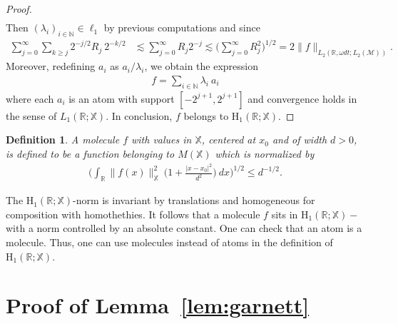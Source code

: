 \documentclass[psamsfonts]{amsart}
\newtheorem{definition}[theorem]{Definition}
\newcommand{\R}{\mathbb{R}}
\newcommand{\N}{\mathbb{N}}
\newcommand{\Lone}{L_1}
\newcommand{\Ltwo}{L_2}
\newcommand{\Hone}{\mathrm{H}_1}
\begin{document}
\begin{proof}
\begin{align*}
        \end{align*}
        Then $(\lambda_i)_{i \in \N} \in \ell_1$ by previous computations and since
        \begin{align*}
          \sum_{j=0}^\infty \sum_{k \geq j} 2^{-j/2} R_j \ 2^{-k/2} &\lesssim \sum_{j=0}^\infty R_j 2^{-j} \lesssim   \Big(\sum_{j=0}^\infty R_j^2\Big)^{1/2} =2                                                                        \|f\|_{\Ltwo(\mathbb{R},\omega dt;\Ltwo(\mathcal{M}))}.
        \end{align*}
        Moreover, redefining $a_i$ as $a_i / \lambda_i$, we obtain the expression
        \begin{align*}
            f = \sum_{i\in\N} \lambda_i \ a_i
        \end{align*}
        where each $a_i$ is an atom with support $[-2^{j+1},2^{j+1}]$ and convergence holds in the sense of $\Lone(\mathbb{R};\mathbb{X})$. In conclusion, $f$ belongs to $\Hone(\R;\mathbb{X})$.
    \end{proof}

    \begin{definition}
         A \emph{molecule} $f$ with values in $\mathbb X$, centered at $x_0$ and of width $d > 0$, is defined to be a function belonging to $M(\mathbb{X})$ which is normalized by
        \begin{align*}
            \Big( \int_{\R} \|f(x)\|_\mathbb{X}^2 \ \Big(1 + \frac{|x-x_0|^2}{d^2}\Big) \ dx \Big)^{1/2} \leq d^{-1/2}.
        \end{align*}
    \end{definition}

    The $\Hone(\R;\mathbb{X})$-norm is invariant by translations and
    homogeneous for composition with homothethies. It follows that a
    molecule $f$ sits in $\Hone(\R;\mathbb{X})-$ with a norm
    controlled by an absolute constant. One can check that an atom is a
    molecule. Thus, one can use molecules instead of atoms in the
    definition of $\Hone(\R;\mathbb{X})$.    

    \section{Proof of Lemma~\ref{lem:garnett}}\label{app:garnett}
\end{document}
